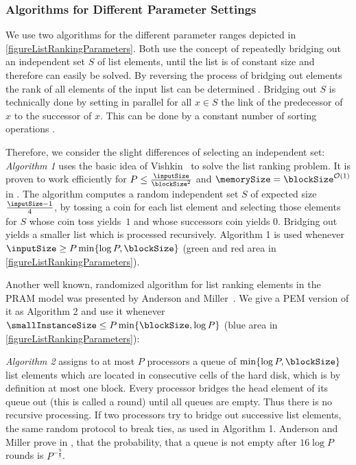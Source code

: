 \documentclass[envcountsame]{llncs}
\def\bO#1{\printmath{\mathcal{O}\left(#1\right)}}
\begin{document}
\subsubsection{Algorithms for Different Parameter Settings}

We use two algorithms for the different parameter ranges depicted in \autoref{figureListRankingParameters}.
Both use the concept of repeatedly bridging out an independent set $S$ of list elements, until the list is of constant size and therefore can easily be solved.
By reversing the process of bridging out elements the rank of all elements of the input list can be determined \cite{2010ArgeEtAlGraphAlgoPEM,1995ChiangExternalMemoryGraphAlgorithms,1991AndersonMillerRanomizedWorkOptLR}. 
Bridging out $S$ is technically done by setting in parallel for all $x\in S$ the link of the predecessor of $x$ to the successor of $x$. 
This can be done by a constant number of sorting operations \cite{2010ArgeEtAlGraphAlgoPEM}.

Therefore, we consider the slight differences of selecting an independent set:
\emph{Algorithm 1} uses the basic idea of Vishkin~\cite{1984VishkinRandomizedLR} to solve the list ranking problem.
It is proven to work efficiently for $P\leq \frac{\inputSize}{\blockSize^2}$ and $\memorySize = \blockSize^{\bO{1}}$ in \cite{2010ArgeEtAlGraphAlgoPEM}. 
The algorithm computes a random independent set $S$ of expected size $\frac{\inputSize-1}{4}$, by tossing a coin for each list element and selecting those elements for $S$ whose coin toss yields~$1$ and whose successors coin yields $0$.
Bridging out yields a smaller list which is processed recursively.
Algorithm 1 is used whenever $\inputSize \geq P\min\{\log P,\blockSize\}$ (green and red area in \autoref{figureListRankingParameters}).

Another well known, randomized algorithm for list ranking \smallInstanceSize elements in the PRAM model was presented by Anderson and Miller~\cite{1991AndersonMillerRanomizedWorkOptLR}.
We give a PEM version of it as Algorithm 2 and use it whenever  $\smallInstanceSize \leq P \min\{\blockSize,\log P\}$ (blue area in \autoref{figureListRankingParameters}):

\emph{Algorithm 2} assigns to at most $P$ processors a queue of $\min\{\log P,\blockSize\}$ list elements which are located in consecutive cells of the hard disk, which is by definition at most one block. 
Every processor bridges the head element of its queue out (this is called a round) until all queues are empty.
Thus there is no recursive processing.
If two processors try to bridge out successive list elements, the same random protocol to break ties, as used in Algorithm 1.
Anderson and Miller prove in \cite{1991AndersonMillerRanomizedWorkOptLR}, that the probability, that a queue is not empty after $16\log P$ rounds is $P^{-\frac{9}{8}}$. 
\end{document}
